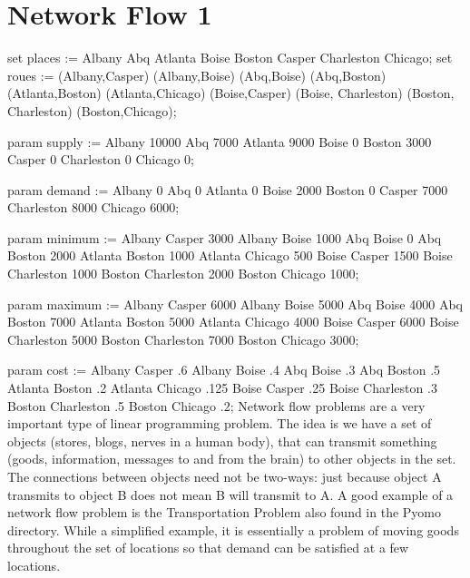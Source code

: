 \documentclass{article}
\begin{document}
\section*{Network Flow 1}

set places := Albany Abq Atlanta Boise Boston Casper Charleston 
              Chicago;
set roues := (Albany,Casper) (Albany,Boise) (Abq,Boise) 
             (Abq,Boston) (Atlanta,Boston) (Atlanta,Chicago) 
             (Boise,Casper) (Boise, Charleston) 
             (Boston, Charleston) (Boston,Chicago);
             
param supply :=
Albany 10000
Abq 7000
Atlanta 9000
Boise 0
Boston 3000
Casper 0
Charleston 0
Chicago 0;

param demand :=
Albany 0
Abq 0
Atlanta 0
Boise 2000
Boston 0
Casper 7000
Charleston 8000
Chicago 6000;

param minimum :=
Albany Casper 3000
Albany Boise 1000
Abq Boise 0
Abq Boston 2000
Atlanta Boston 1000
Atlanta Chicago 500
Boise Casper 1500
Boise Charleston 1000
Boston Charleston 2000
Boston Chicago 1000;

param maximum :=
Albany Casper 6000
Albany Boise 5000
Abq Boise 4000
Abq Boston 7000
Atlanta Boston 5000
Atlanta Chicago 4000
Boise Casper 6000
Boise Charleston 5000
Boston Charleston 7000
Boston Chicago 3000;

param cost :=
Albany Casper .6
Albany Boise .4
Abq Boise .3
Abq Boston .5
Atlanta Boston .2
Atlanta Chicago .125
Boise Casper .25
Boise Charleston .3
Boston Charleston .5
Boston Chicago .2;
Network flow problems are a very important type of linear programming problem.  The idea is we have a set of objects (stores, blogs, nerves in a human body), that can transmit something (goods, information, messages to and from the brain) to other objects in the set.  The connections between objects need not be two-ways: just because object A transmits to object B does not mean B will transmit to A.  A good example of a network flow problem is the Transportation Problem also found in the Pyomo directory.  While a simplified example, it is essentially a problem of moving goods throughout the set of locations so that demand can be satisfied at a few locations.
\end{document}
